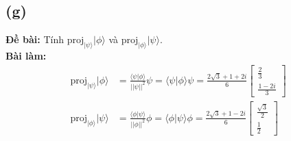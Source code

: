 \subsection{(g)}
\textbf{Đề bài:} Tính $\mathrm{proj}_{|\psi\rangle}|\phi\rangle$ và $\mathrm{proj}_{|\phi\rangle}|\psi\rangle$.\\
\textbf{Bài làm:}
\begin{align*}
    \mathrm{proj}_{|\psi\rangle}|\phi\rangle & = \frac{\langle\psi|\phi\rangle}{||\psi||^2} \psi = \langle\psi|\phi\rangle\psi = \frac{2\sqrt{3} + 1 + 2i}{6} \begin{bmatrix}
                                                                                                                                                                  \frac{2}{3} \\
                                                                                                                                                                  \frac{1-2i}{3}
                                                                                                                                                              \end{bmatrix}                    \\
    \mathrm{proj}_{|\phi\rangle}|\psi\rangle & = \frac{\langle\phi|\psi\rangle}{||\phi||^2} \phi = \langle\phi|\psi\rangle\phi = \frac{2\sqrt{3} + 1 - 2i}{6} \begin{bmatrix}
                                                                                                                                                                  \frac{\sqrt{3}}{2} \\
                                                                                                                                                                  \frac{1}{2}
                                                                                                                                                              \end{bmatrix}
\end{align*}

